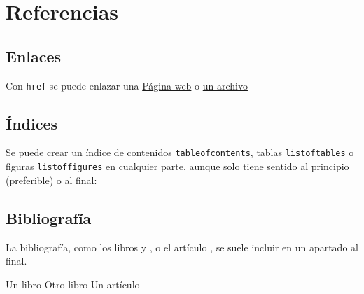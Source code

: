 \documentclass[12pt]{article}
\begin{document}
	\section{Referencias}
	\subsection{Enlaces}
	Con \texttt{href} se puede enlazar una \href{http://www.upct.es/}{Página web} o \href{file:latex_logo.png}{un archivo}
	\subsection{Índices}
	Se puede crear un índice de contenidos \texttt{tableofcontents}, tablas \texttt{listoftables} o figuras \texttt{listoffigures} en cualquier parte, aunque solo tiene sentido al principio (preferible) o al final:
	\tableofcontents
	\listoftables
	\listoffigures
	\subsection{Bibliografía}
	La bibliografía, como los libros \cite{libro} y \cite[cap.~3]{otro_libro}, o el artículo \cite[pág.~12]{articulo}, se suele incluir en un apartado al final.
	\begin{thebibliography}{9}
		 Un libro
		 Otro libro
		 Un artículo
	\end{thebibliography}
\end{document}
